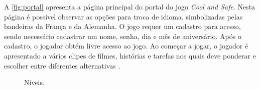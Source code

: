 A \autoref{fig:portal} apresenta a página principal do portal do jogo \textit{Cool and Safe}. Nesta página é possível observar as opções para troca de idioma, simbolizadas pelas bandeiras da França e da Alemanha. O jogo requer um cadastro para acesso, sendo necessário cadastrar um nome, senha, dia e mês de aniversário. Após o cadastro, o jogador obtém livre acesso ao jogo. Ao começar a jogar, o jogador é apresentado a vários clipes de filmes, histórias e tarefas nos quais deve ponderar e escolher entre diferentes alternativas \cite{mueller2012web}. 

\begin{figure}%
  \vspace{-5pt}
  \caption{\label{fig:coolniveis}Níveis.\vspace{1pt}}


\end{figure}
